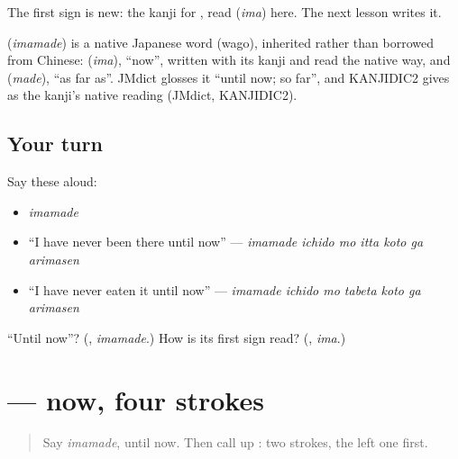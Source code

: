 The first sign is new: the kanji for \textbf{}, read \textbf{} (\emph{ima}) here. The next lesson writes it.

\begin{cousinweb}
\textbf{} (\emph{imamade}) is a native Japanese word (wago), inherited rather than borrowed from Chinese: \textbf{} (\emph{ima}), \textquotedblleft{}now\textquotedblright{}, written with its kanji and read the native way, and \textbf{} (\emph{made}), \textquotedblleft{}as far as\textquotedblright{}. JMdict glosses it \textquotedblleft{}until now; so far\textquotedblright{}, and KANJIDIC2 gives  as the kanji's native reading (JMdict, KANJIDIC2).
\end{cousinweb}

\subsection*{Your turn}
Say these aloud:

\begin{itemize}
\raggedright
  \item \emph{imamade}
  \item \textquotedblleft{}I have never been there until now\textquotedblright{} — \emph{imamade ichido mo itta koto ga arimasen}
  \item \textquotedblleft{}I have never eaten it until now\textquotedblright{} — \emph{imamade ichido mo tabeta koto ga arimasen}
\end{itemize}

\begin{tcolorbox}[breakable,colback=teal!4,colframe=teal!35!black,title={Before you move on}]
\textquotedblleft{}Until now\textquotedblright{}? (\textbf{}, \emph{imamade}.) How is its first sign read? (\textbf{}, \emph{ima}.)
\end{tcolorbox}
\section[\texorpdfstring{\ja{今} (ima)}{今 (ima)}]{ — now, four strokes}

\label{lesson:JA-W258-ima-kanji}



\begin{quote}
Say \emph{imamade}, until now. Then call up \textbf{}: two strokes, the left one first.
\end{quote}


